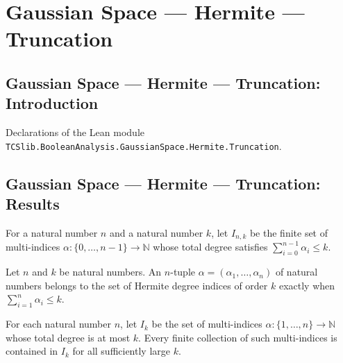 \section{Gaussian Space --- Hermite --- Truncation}
\subsection*{Gaussian Space --- Hermite --- Truncation: Introduction}

Declarations of the Lean module \texttt{TCSlib.BooleanAnalysis.GaussianSpace.Hermite.Truncation}.

\subsection*{Gaussian Space --- Hermite --- Truncation: Results}

\begin{definition}
\label{BooleanAnalysis.GaussianSpace.hermiteDegreeIndices}
\leanok
For a natural number $n$ and a natural number $k$, let $I_{n,k}$ be the finite set of
multi-indices $\alpha:\{0,\ldots,n-1\}\to\mathbb{N}$ whose total degree satisfies
$\sum_{i=0}^{n-1}\alpha_i\le k$.
\end{definition}

\begin{lemma}
\label{BooleanAnalysis.GaussianSpace.mem_hermiteDegreeIndices}
\leanok
{}
Let $n$ and $k$ be natural numbers. An $n$-tuple $\alpha=(\alpha_1,\ldots,\alpha_n)$ of
natural numbers belongs to the set of Hermite degree indices of order $k$ exactly when
$\sum_{i=1}^n\alpha_i\le k$.
\end{lemma}

\begin{lemma}
\label{BooleanAnalysis.GaussianSpace.hermiteDegreeIndices_tendsto}
\leanok
{}
For each natural number $n$, let $I_k$ be the set of multi-indices
$\alpha:\{1,\ldots,n\}\to\mathbb N$ whose total degree is at most $k$. Every finite
collection of such multi-indices is contained in $I_k$ for all sufficiently large $k$.
\end{lemma}

